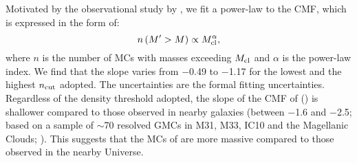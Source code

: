 \IfFileExists{emulateapjlegacy.cls}{\documentclass[iop]{emulateapjlegacy}}{\documentclass[iop]{emulateapj}}
\begin{document}
Motivated by the observational study by \citealt{Blitz07a}, we fit a power-law to the CMF, which is expressed in the form of:
\begin{equation}
n\left(M^\prime > M\right) \propto M_{\rm cl}^\alpha,
\end{equation}
where $n$ is the number of MCs with masses exceeding $M_{\rm cl}$ and $\alpha$ is the power-law index.
We find that 
the slope varies from $-$0.49 to $-$1.17 for the lowest and the highest $n_{\rm cut}$ adopted.
The uncertainties are the formal fitting uncertainties.
Regardless of the density threshold adopted, the slope of the CMF of \flower ()
is shallower compared to those observed in nearby galaxies (between $-$1.6 and $-$2.5; based on a sample of
$\sim$70 resolved GMCs in M31, M33, IC10 and the Magellanic Clouds; \citealt{Blitz07a}). %
This suggests that the MCs of \flower are more massive compared to those observed in the nearby Universe.
\end{document}
